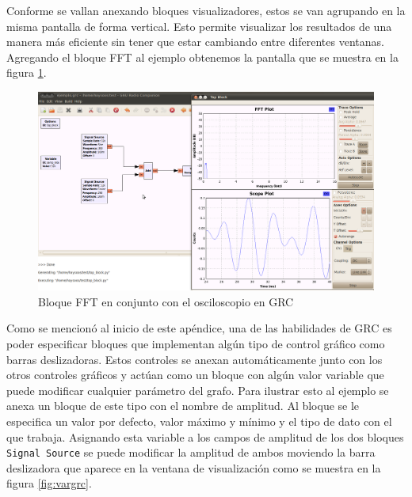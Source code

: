 Conforme se vallan anexando bloques visualizadores, estos se van agrupando en la misma pantalla de
forma vertical. Esto permite visualizar los resultados de una manera m\'as eficiente sin tener que
estar cambiando entre diferentes ventanas. Agregando el bloque FFT al ejemplo obtenemos la pantalla
que se muestra en la figura \ref{fig:fftgrc}.

\begin{figure}[htp]
  \centering
  \includegraphics[width=5.5in]{figs/grc8}
  \vspace{0.1in}
  \caption{Bloque FFT en conjunto con el osciloscopio en GRC}
  \label{fig:fftgrc}
\end{figure}

Como se mencion\'o al inicio de este ap\'endice, una de las habilidades de GRC es poder especificar
bloques que implementan alg\'un tipo de control gr\'afico como barras deslizadoras. Estos controles se
anexan autom\'aticamente junto con los otros controles gr\'aficos y act\'uan como un bloque con
alg\'un valor variable que puede modificar cualquier par\'ametro del grafo. Para ilustrar esto al
ejemplo se anexa un bloque de este tipo con el nombre de amplitud. Al bloque se le especifica un valor por defecto,
valor m\'aximo y m\'inimo y el tipo de dato con el que trabaja. Asignando esta variable a los campos
de amplitud de los dos bloques \verb|Signal Source| se puede modificar la amplitud de ambos moviendo la
barra deslizadora que aparece en la ventana de visualizaci\'on como se muestra en la figura \ref{fig:vargrc}.


